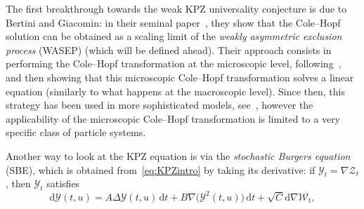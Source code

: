 \documentclass[10pt]{amsart}
\theoremstyle{definition}\newtheorem{defi}[theo]{Definition}\newtheorem{rema}[theo]{Remark}\newtheorem{exam}[theo]{Example}\newtheorem{exem}[theo]{Example}\newtheorem{nota}[theo]{Notation}
\newcommand{\mc}[1]{{\mathcal #1}}
\renewcommand{\mc}[1]{{\mathcal #1}}
\newcommand*{\dd}{\mathrm{d}}
\newcommand*{\dt}{\dd t}
\begin{document}
The first breakthrough towards the weak KPZ universality conjecture is due to Bertini and Giacomin: in their seminal paper~\cite{BerG}, they show that the Cole--Hopf solution can be obtained as a scaling limit of the \emph{weakly asymmetric exclusion process} (WASEP) (which will be defined ahead). Their approach consists in performing the Cole--Hopf transformation at the microscopic level, following~\cite{GAR}, and then showing that this microscopic Cole--Hopf transformation solves a linear equation (similarly to what happens at the macroscopic level). Since then, this strategy has been used in more sophisticated models, see~\cite{Corwin2016,CST,corwin2017,Dembo2016}, however the applicability of the microscopic Cole--Hopf transformation is limited to a very specific class of particle systems.

Another way to look at the KPZ equation is via the \emph{stochastic Burgers equation} (SBE), which is obtained from~\eqref{eq:KPZintro} by taking its derivative: if $\mc Y_t = \nabla \mc Z_t$, then $\mc Y_t$ satisfies
\begin{equation}\label{eq:SBEintro}
\dd\mc Y(t,u) = A \Delta \mc Y(t,u)\,\dt + B\nabla \big(\mc Y^2(t,u)\big) \,\dt + \sqrt C \dd\nabla\mc W_t,
\end{equation}
\end{document}
